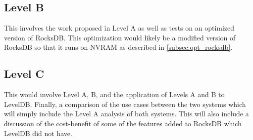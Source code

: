 \documentclass[twocolumn,11pt]{article}
\begin{document}
\subsection{Level B}

This involves the work proposed in Level A as well as tests on an optimized
version of RocksDB. This optimization would likely be a modified version of
RocksDB so that it runs on NVRAM as described in \ref{subsec:opt_rocksdb}.

\subsection{Level C}

This would involve Level A, B, and the application of Levels A and B to LevelDB.
Finally, a comparison of the use cases between the two systems which will simply
include the Level A analysis of both systems. This will also include a
discussion of the cost-benefit of some of the features added to RocksDB which
LevelDB did not have.




\end{document}

